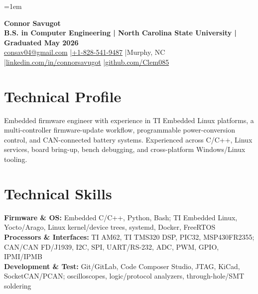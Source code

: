 \documentclass[10pt,letterpaper]{article}
\begin{document}
\fontsize{9.8}{10.72}\selectfont
\setlength{\RaggedRightRightskip}{0pt plus 5em}
\RaggedRight
\emergencystretch=1em

\begin{center}
  {\fontsize{21.5}{22.2}\selectfont\bfseries Connor Savugot}\\[1.5pt]
  {\bfseries B.S. in Computer Engineering | North Carolina State University | Graduated May 2026}\\[1.5pt]
  {\fontsize{9.6}{10.2}\selectfont
    \href{mailto:consav04@gmail.com}{consav04@gmail.com}
    \enspace|\enspace \href{tel:+18285419487}{+1-828-541-9487}
    \enspace|\enspace Murphy, NC
    \enspace|\enspace \href{https://linkedin.com/in/connorsavugot}{linkedin.com/in/connorsavugot}
    \enspace|\enspace \href{https://github.com/Clem085}{github.com/Clem085}}
\end{center}
\vspace{-0.18cm}

\section{Technical Profile}
Embedded firmware engineer with experience in TI Embedded Linux platforms, a multi-controller firmware-update workflow, programmable power-conversion control, and CAN-connected battery systems. Experienced across C/C++, Linux services, board bring-up, bench debugging, and cross-platform Windows/Linux tooling.

\section{Technical Skills}
\textbf{Firmware \& OS:} Embedded C/C++, Python, Bash; TI Embedded Linux, Yocto/Arago, Linux kernel/device trees, systemd, Docker, FreeRTOS\\
\textbf{Processors \& Interfaces:} TI AM62, TI TMS320 DSP, PIC32, MSP430FR2355; CAN/CAN FD/J1939, I2C, SPI, UART/RS-232, ADC, PWM, GPIO, IPMI/IPMB\\
\textbf{Development \& Test:} Git/GitLab, Code Composer Studio, JTAG, KiCad, SocketCAN/PCAN; oscilloscopes, logic/protocol analyzers, through-hole/SMT soldering
\end{document}

